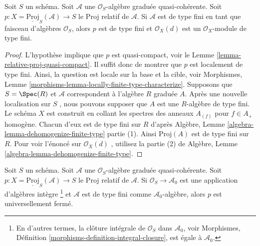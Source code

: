 \begin{lemma}
\label{lemma-relative-proj-finite-type}
Soit  $S$  un schéma. Soit  $\mathcal{A}$  une  $\mathcal{O}_S$-algèbre graduée
quasi-cohérente. Soit  $p : X = \underline{\text{Proj}}_S(\mathcal{A}) \to S$  le Proj relatif de  $\mathcal{A}$. Si
 $\mathcal{A}$  est de type fini en tant que faisceau d'algèbres  $\mathcal{O}_S$, alors
 $p$  est de type fini et  $\mathcal{O}_X(d)$  est un  $\mathcal{O}_X$-module de type
fini.
\end{lemma}

\begin{proof}
L'hypothèse implique que  $p$  est quasi-compact, voir le Lemme
 \ref{lemma-relative-proj-quasi-compact}. Il suffit donc de montrer que  $p$  est localement de type
fini. Ainsi, la question est locale sur la base et la cible, voir Morphismes,
Lemme  \ref{morphisms-lemma-locally-finite-type-characterize}. Supposons que  $S = \Spec(R)$  et  $\mathcal{A}$  correspondent à
l'algèbre  $R$ graduée  $A$. Après une nouvelle localisation sur
 $S$ , nous pouvons supposer que  $A$  est une  $R$-algèbre
de type fini. Le schéma  $X$  est construit en collant les spectres des
anneaux  $A_{(f)}$  pour  $f \in A_{+}$  homogène. Chacun d'eux est de type fini sur
 $R$  d'après Algèbre, Lemme  \ref{algebra-lemma-dehomogenize-finite-type}  partie (1). Ainsi  $\text{Proj}(A)$ 
est de type fini sur  $R$. Pour voir l'énoncé sur  $\mathcal{O}_X(d)$ , utilisez
la partie (2) de Algèbre, Lemme  \ref{algebra-lemma-dehomogenize-finite-type}.
\end{proof}

\begin{lemma}
\label{lemma-relative-proj-universally-closed}
Soit  $S$  un schéma. Soit  $\mathcal{A}$  une  $\mathcal{O}_S$-algèbre graduée
quasi-cohérente. Soit  $p : X = \underline{\text{Proj}}_S(\mathcal{A}) \to S$  le Proj relatif de  $\mathcal{A}$. Si
 $\mathcal{O}_S \to \mathcal{A}_0$  est une application d'algèbres intègre \footnote{ En
d'autres termes, la clôture intégrale de  $\mathcal{O}_S$  dans  $\mathcal{A}_0$, voir
Morphismes, Définition  \ref{morphisms-definition-integral-closure}, est égale à  $\mathcal{A}_0$. }  et
 $\mathcal{A}$  est de type fini comme  $\mathcal{A}_0$-algèbre, alors  $p$  est
universellement fermé.
\end{lemma}


